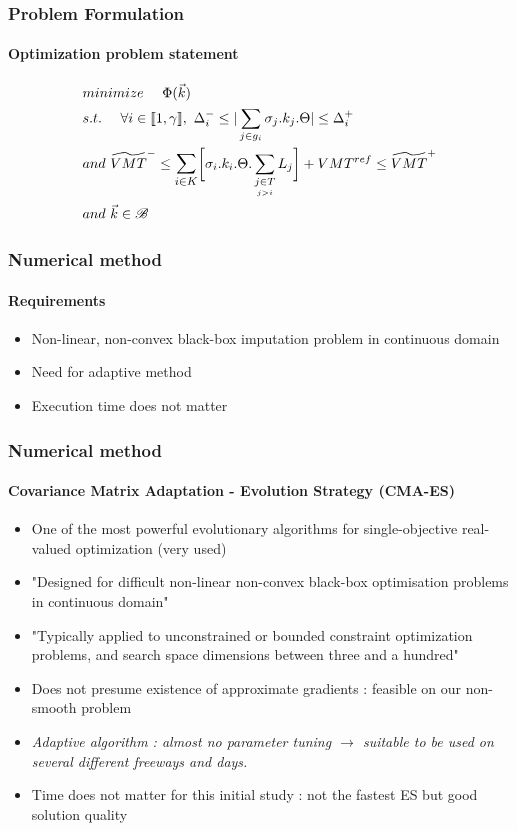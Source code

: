 \documentclass[fleqn]{beamer}
\begin{document}
\begin{frame}
	\frametitle{Problem Formulation}
	\framesubtitle{Optimization problem statement}
	\begin{align*}
	&minimize\ \ \ \ \Phi(\vec{k}) \\
	&s.t.\ \ \ \ 	\forall i\in \llbracket 1,\gamma \rrbracket,\ \Delta_{i}^{-}\leq |\sum\limits_{j\in g_{i}}\sigma_{j}.k_{j}.\Theta| \leq \Delta_{i}^{+} \nonumber\\
	&and\ \widetilde{VMT}^{-}\leq\mathlarger{\sum\limits_{i\in K}}\biggl[\sigma_{i}.k_{i}.\Theta.	\sum\limits_{\underset{j>i}{j\in T}}L_{j}\biggr]+VMT^{ref}\leq \widetilde{VMT}^{+}\nonumber \\	
	&and\ \vec{k} \in \mathscr{B} \nonumber
	\end{align*}
\end{frame}


\begin{frame}
	\frametitle{Numerical method}
	\framesubtitle{Requirements}
	\begin{itemize}
		\item Non-linear, non-convex black-box imputation problem in continuous domain
		\item Need for adaptive method
		\item Execution time does not matter
	\end{itemize}
\end{frame}


\begin{frame}
	\frametitle{Numerical method}
	\framesubtitle{Covariance Matrix Adaptation - Evolution Strategy (CMA-ES)}
	\begin{itemize}
		\item One of the most powerful evolutionary algorithms for single-objective real-valued optimization (very used) 
		\item "Designed for difficult non-linear non-convex black-box optimisation problems in continuous domain"
		\item "Typically applied to unconstrained or bounded constraint optimization problems, and search space dimensions between three and a hundred"
		\item Does not presume existence of approximate gradients : feasible on our non-smooth problem
		\item \em Adaptive \em algorithm : almost no parameter tuning $\rightarrow$ suitable to be used on several different freeways and days.
		\item Time does not matter for this initial study : not the fastest ES but good solution quality 	
	\end{itemize}
\end{frame}
\end{document}
